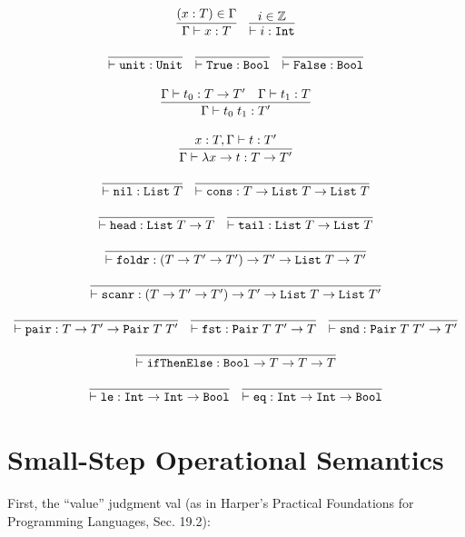 \documentclass[10pt]{article}
\newcommand{\ttt}[1]{\texttt{#1}}
\newcommand{\ra}{\ensuremath{\rightarrow}}
\newcommand{\Int}{\ttt{Int}}
\newcommand{\Bool}{\ttt{Bool}}
\newcommand{\tyPair}{\ttt{Pair}}
\newcommand{\List}{\ttt{List}}
\begin{document}
\[
  \begin{array}{cc}
    \infer{\Gamma \vdash x : T}{(x : T) \in \Gamma}
    ~~~
    \infer{\vdash i : \ttt{Int}}{i \in \mathbb{Z}}
    \\\\
    \infer{\vdash \ttt{unit} : \ttt{Unit}}{}
    ~~~
    \infer{\vdash \ttt{True} : \ttt{Bool}}{}
    ~~~
    \infer{\vdash \ttt{False} : \ttt{Bool}}{}
    \\\\
    \infer{\Gamma \vdash t_0\; t_1 : T'}{\Gamma \vdash t_0 : T \ra T' & \Gamma \vdash t_1 : T}
    \\\\
    \infer{\Gamma \vdash \lambda x \ra t : T \ra T'}{x : T, \Gamma \vdash t : T'}
    \\\\
    \infer{\vdash \ttt{nil} : \List\; T}{}
    ~~~
    \infer{\vdash \ttt{cons} : T \ra \List\; T \ra \List\; T}{}
    \\\\
    \infer{\vdash \ttt{head} : \List\; T \ra T}{}
    ~~~
    \infer{\vdash \ttt{tail} : \List\; T \ra \List\; T}{}
    \\\\
    \infer{\vdash \ttt{foldr} : (T \ra T' \ra T') \ra T' \ra \List\; T \ra T'}{}
    \\\\
    \infer{\vdash \ttt{scanr} : (T \ra T' \ra T') \ra T' \ra \List\; T \ra \List\; T'}{}
    \\\\
    \infer{\vdash \ttt{pair} : T \ra T' \ra \tyPair\; T\; T'}{}
    ~~~
    \infer{\vdash \ttt{fst} : \tyPair\; T\; T' \ra T}{}
    ~~~
    \infer{\vdash \ttt{snd} : \tyPair\; T\; T' \ra T'}{}
    \\\\
    \infer{\vdash \ttt{ifThenElse} : \Bool \ra T \ra T \ra T}{}
    \\\\
    \infer{\vdash \ttt{le} : \Int \ra \Int \ra \Bool}{}
    ~~~
    \infer{\vdash \ttt{eq} : \Int \ra \Int \ra \Bool}{}
  \end{array}
\]

\section{Small-Step Operational Semantics}

First, the ``value'' judgment val (as in Harper's Practical Foundations for Programming Languages, Sec. 19.2):
\end{document}
